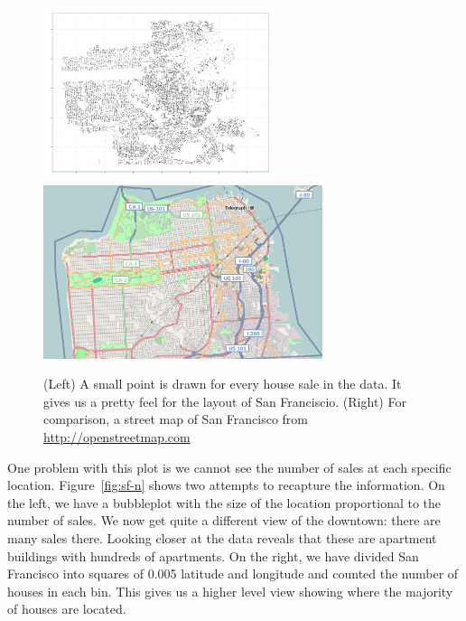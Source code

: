 \documentclass[oneside]{article}
\begin{document}
\begin{figure}[htbp]
  \centering
  \includegraphics[height=2in]{sf-geo}%
  \includegraphics[height=2in]{sf-map}
  \caption{(Left) A small point is drawn for every house sale in the data.  It gives us a pretty feel for the layout of San Franciscio. (Right) For comparison, a street map of San Francisco from \url{http://openstreetmap.com}}
  \label{fig:sf-geo}
\end{figure}

One problem with this plot is we cannot see the number of sales at each specific location. Figure~\ref{fig:sf-n} shows two attempts to recapture the information. On the left, we have a bubbleplot with the size of the location proportional to the number of sales. We now get quite a different view of the downtown: there are many sales there. Looking closer at the data reveals that these are apartment buildings with hundreds of apartments. On the right, we have divided San Francisco into squares of 0.005 latitude and longitude and counted the number of houses in each bin. This gives us a higher level view showing where the majority of houses are located.
\end{document}
